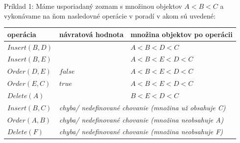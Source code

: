 \documentclass[
  digital,     %
  oneside,     %
  nosansbold,  %
  nocolorbold, %
  lof,         %
  lot,         %
]{fithesis4}
\begin{document}
Príklad 1:
Máme usporiadaný zoznam s množinou objektov $A < B < C$ a vykonávame na ňom nasledovné operácie v poradí v akom sú uvedené:\\
\begin{table}
\begin{tabularx}{\textwidth}{| l | l | l |}
    operácia & návratová hodnota & množina objektov po operácii \\
    \midrule
    $Insert(B, D)$ &  & $A < B < D < C$\\
    $Insert(B, E)$ &  & $A < B < E < D < C$\\
    $Order(D, E)$ & $false$ & $A < B < E < D < C$\\
    $Order(E, C)$ & $true$ & $A < B < E < D < C$\\
    $Delete(A)$ &  & $B < E < D < C$\\
    $Insert(B, C)$ & \multicolumn{2}{l|}{\textit{chyba/ nedefinované chovanie (množina už obsahuje C)}}\\
    $Order(A, B)$ & \multicolumn{2}{l|}{\textit{chyba/ nedefinované chovanie (množina neobsahuje A)}}\\
    $Delete(F)$ & \multicolumn{2}{l|}{\textit{chyba/ nedefinované chovanie (množina neobsahuje F)}}\\
  \end{tabularx}
\end{table}




\end{document}
